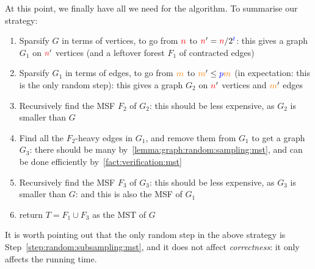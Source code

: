 At this point, we finally have all we need for the algorithm. To summarise our strategy:
\begin{enumerate}
    \item Sparsify $G$ in terms of vertices, to go from ${\textcolor{red}{n}}$ to ${\textcolor{red}{n}}' = {\textcolor{red}{n}}/2^{\textcolor{blue}{t}}$: this gives a graph $G_1$ on ${\textcolor{red}{n}}'$ vertices (and a leftover forest $F_1$ of contracted edges)
    \item\label{step:random:subsampling:mst} Sparsify $G_1$ in terms of edges, to go from $\textcolor{orange}{m}$ to $\textcolor{orange}{m}' \leq \textcolor{blue}{p}\textcolor{orange}{m}$ (in expectation: this is the only random step): this gives a graph $G_2$ on ${\textcolor{red}{n}}'$ vertices and $\textcolor{orange}{m}'$ edges
    \item Recursively find the MSF $F_2$ of $G_2$: this should be less expensive, as $G_2$ is smaller than $G$
    \item Find all the $F_2$-heavy edges in $G_1$, and remove them from $G_1$ to get a graph $G_3$: there should be many by~\cref{lemma:graph:random:sampling:mst}, and can be done efficiently by~\cref{fact:verification:mst}
    \item Recursively find the MSF $F_3$ of $G_3$: this should be less expensive, as $G_3$ is smaller than $G$: and this is also the MSF of $G_1$
    \item return $T=F_1\cup F_3$ as the MST of $G$
\end{enumerate}
It is worth pointing out that the only random step in the above strategy is Step~\ref{step:random:subsampling:mst}, and it does not affect \emph{correctness}: it only affects the running time.\smallskip


